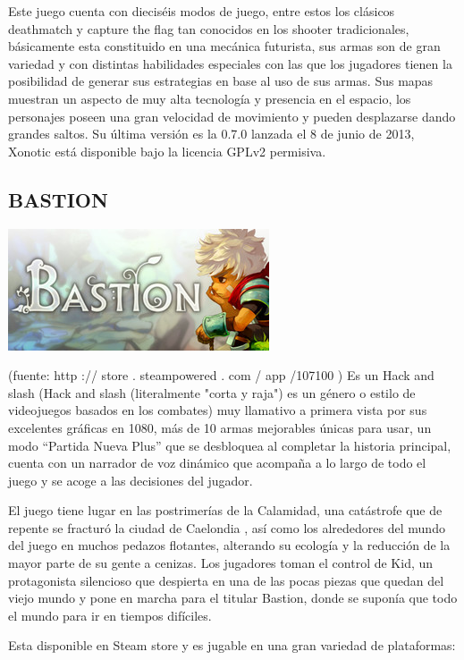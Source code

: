 Este juego cuenta con dieciséis modos de juego, entre estos los
clásicos deathmatch y capture the flag tan conocidos en los
shooter tradicionales, básicamente esta constituido en una
mecánica futurista, sus armas son de gran variedad y con
distintas habilidades especiales con las que los jugadores tienen
la posibilidad de generar sus
estrategias en base al uso de sus armas. Sus mapas muestran un
aspecto de muy alta tecnología y presencia en el espacio, los
personajes poseen una gran velocidad de movimiento y pueden
desplazarse dando grandes saltos.
Su última versión es la 0.7.0 lanzada el 8 de junio de 2013,
Xonotic está disponible bajo la licencia GPLv2 permisiva.

\subsection*{BASTION}
\includegraphics[scale=0.5]{img/cp07/img0702.png}

(fuente: http :// store . steampowered . com / app /107100 )
Es un Hack and slash (Hack and slash (literalmente "corta y
raja") es un género o estilo de videojuegos basados en los
combates) muy llamativo a primera vista por sus excelentes
gráficas en 1080, más de 10 armas mejorables únicas para usar,
un modo “Partida Nueva Plus” que se desbloquea al completar la
historia principal, cuenta con un narrador de voz dinámico que
acompaña a lo largo de todo el juego y se acoge a las decisiones
del jugador.

El juego tiene lugar en las postrimerías de la Calamidad, una
catástrofe que de repente se fracturó la ciudad de Caelondia ,
así como los alrededores del mundo del juego en muchos
pedazos flotantes, alterando su ecología y la reducción de la
mayor parte de su gente a cenizas. Los jugadores toman el
control de Kid, un protagonista silencioso que despierta en una
de las pocas piezas que quedan del viejo mundo y pone en
marcha para el titular Bastion, donde se suponía que todo el
mundo para ir en tiempos difíciles.

Esta disponible en Steam store y es jugable en una gran
variedad de plataformas:

